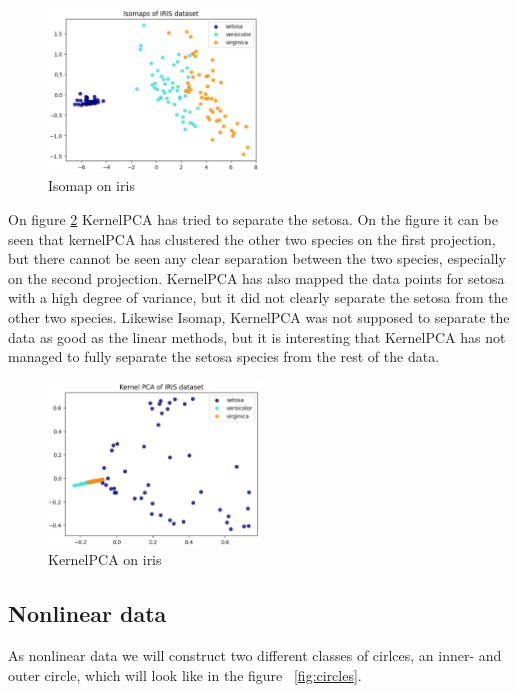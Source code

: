 \begin{figure}[h]
    \centering
    \includegraphics[width=0.5\textwidth]{figures/theory-example-figures/iris-isomap.png}
    \caption{Isomap on iris}
    \label{fig:iris-isomap}
    \end{figure}

On figure \ref{fig:iris-kernelpca} KernelPCA has tried to separate the setosa. On the figure it can be seen that kernelPCA has clustered the other two species on the first projection, but there cannot be seen any clear separation between the two species, especially on the second projection. KernelPCA has also mapped the data points for setosa with a high degree of variance, but it did not clearly separate the setosa from the other two species. Likewise Isomap, KernelPCA was not supposed to separate the data as good as the linear methods, but it is interesting that KernelPCA has not managed to fully separate the setosa species from the rest of the data.

\begin{figure}[h]
    \centering
    \includegraphics[width=0.5\textwidth]{figures/theory-example-figures/iris-kernelpca.png}
    \caption{KernelPCA on iris}
    \label{fig:iris-kernelpca}
    \end{figure}

\subsection{Nonlinear data}
As nonlinear data we will construct two different classes of cirlces, an inner- and outer circle, which will look like in the figure ~\ref{fig:circles}.


